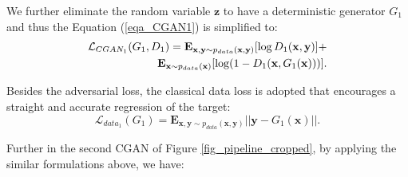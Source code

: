 \documentclass[10pt,twocolumn,letterpaper]{article}
\begin{document}
We further eliminate the random variable $\mathbf{z}$ to have a deterministic generator $G_1$ and thus the Equation (\ref{eqa_CGAN1}) is simplified to:
\begin{eqnarray}
\small{ \mathcal{L}_{CGAN_1}(G_1,  D_1)= \mathbf{E}_{\mathbf{x}, \mathbf{y} \sim p_{data}(\mathbf{x}, \mathbf{y})}[\log {D_1(\mathbf{x}, \mathbf{y})}] + }\nonumber\\
\mathbf{E}_{\mathbf{x} \sim p_{data}(\mathbf{x})}[\log ({1 - D_1(\mathbf{x}, G_1(\mathbf{x}))})].
\label{eqa_CGAN1_simple}
\end{eqnarray}

Besides the adversarial loss, the classical data loss is adopted that encourages a straight and accurate regression of the target:
\begin{equation}
\mathcal{L}_{data_1}(G_1)= \mathbf{E}_{\mathbf{x}, \mathbf{y} \sim p_{data}(\mathbf{x}, \mathbf{y})} ||\mathbf{y} - G_1(\mathbf{x})||.
\label{eqa_data_1}
\end{equation}




Further in the second CGAN of Figure \ref{fig_pipeline_cropped}, by applying the similar formulations above, we have:







\begin{table}[t]
	\begin{center}
	\end{center}
	\vspace{-5pt}
	\caption{The architectures for discriminator $D_1/D_2$ of ST-CGAN. Annotations are kept the same with Table \ref{tab_network_G}.}
	\label{tab_network_D}
	\vspace{-8pt}
\end{table}
\end{document}
